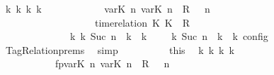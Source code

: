 \begin{isabellebody}
\ {\isacartoucheopen}{\isasymexists}{\isasymGamma}\isactrlsub k\ {\isasymPsi}\isactrlsub k\ {\isasymPhi}\isactrlsub k\ k{\isachardot}\isanewline
\ \ \ \ \ \ \ \ \ \ \ \ {\isacharparenleft}{\isacharparenleft}{\isacharparenleft}{\isacharparenleft}{\isasymlfloor}{\isasymtau}\isactrlsub v\isactrlsub a\isactrlsub r{\isacharparenleft}K\ n{\isacharparenright}{\isacharcomma}\ {\isasymtau}\isactrlsub v\isactrlsub a\isactrlsub r{\isacharparenleft}K\ n{\isacharparenright}{\isasymrfloor}\ {\isasymin}\ R{\isacharparenright}\ {\isacharhash}\ {\isasymGamma}{\isacharparenright}{\isacharcomma}\ n\isanewline
\ \ \ \ \ \ \ \ \ \ \ \ \ \ \ \ {\isasymturnstile}\ {\isasymPsi}\ {\isasymtriangleright}\ {\isacharparenleft}{\isacharparenleft}time{\isacharminus}relation\ {\isasymlfloor}K\ K\ {\isasymin}\ R{\isacharparenright}\ {\isacharhash}\ {\isasymPhi}{\isacharparenright}{\isacharparenright}\isanewline
\ \ \ \ \ \ \ \ \ \ \ \ \ \ {\isasymhookrightarrow}\isactrlbsup k\isactrlesup \ {\isacharparenleft}{\isasymGamma}\isactrlsub k{\isacharcomma}\ Suc\ n\ {\isasymturnstile}\ {\isasymPsi}\isactrlsub k\ {\isasymtriangleright}\ {\isasymPhi}\isactrlsub k{\isacharparenright}{\isacharparenright}\ {\isasymand}\ {\isasymrho}\ {\isasymin}\ {\isasymlbrakk}\ {\isasymGamma}\isactrlsub k{\isacharcomma}\ Suc\ n\ {\isasymturnstile}\ {\isasymPsi}\isactrlsub k\ {\isasymtriangleright}\ {\isasymPhi}\isactrlsub k\ {\isasymrbrakk}\isactrlsub c\isactrlsub o\isactrlsub n\isactrlsub f\isactrlsub i\isactrlsub g{\isacartoucheclose}\isanewline
\ \ \ \ \ \ \ \ \ \ \isamarkupfalse%
\ TagRelation{\isachardot}prems\ \isamarkupfalse%
\ simp\isanewline
\isanewline
\ \ \ \ \ \ \ \ \isamarkupfalse%
\ this\ \isamarkupfalse%
\ {\isasymGamma}\isactrlsub k\ {\isasymPsi}\isactrlsub k\ {\isasymPhi}\isactrlsub k\ k\isanewline
\ \ \ \ \ \ \ \ \ \ \ fp{\isacharcolon}{\isacartoucheopen}{\isacharparenleft}{\isacharparenleft}{\isacharparenleft}{\isacharparenleft}{\isasymlfloor}{\isasymtau}\isactrlsub v\isactrlsub a\isactrlsub r{\isacharparenleft}K\ n{\isacharparenright}{\isacharcomma}\ {\isasymtau}\isactrlsub v\isactrlsub a\isactrlsub r{\isacharparenleft}K\ n{\isacharparenright}{\isasymrfloor}\ {\isasymin}\ R{\isacharparenright}\ {\isacharhash}\ {\isasymGamma}{\isacharparenright}{\isacharcomma}\ n\isanewline

\end{isabellebody}
